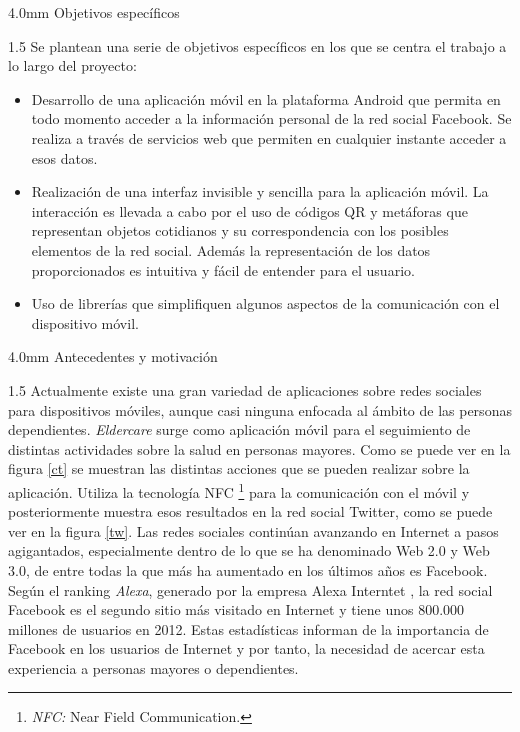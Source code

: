 \documentclass[12pt,a4paper,spanish,oneside]{report}
\makeatletter
\renewcommand{\subsection}{
  \@startsection{subsection}{2}{0mm}{2mm}
  {4.0mm}{\Large\bf}
}
\theoremstyle{plain} \newtheorem{nota}{Nota}
\makeatother
\begin{document}
\subsection{Objetivos específicos}
\begin{spacing}{1.5}
Se plantean una serie de objetivos específicos en los que se centra el trabajo a
lo largo del proyecto:
\begin{itemize}
\item Desarrollo de una aplicación móvil en la plataforma Android que permita en
todo momento acceder a la información personal de la red social Facebook. Se 
realiza a través de servicios web que permiten en cualquier instante acceder a 
esos datos.
\item Realización de una interfaz invisible y sencilla para la aplicación móvil.
La interacción es llevada a cabo por el uso de códigos QR y metáforas
 que representan objetos cotidianos y su correspondencia con los posibles 
elementos de la red social. Además la representación de los datos 
proporcionados es intuitiva y fácil de entender para el usuario.
\item Uso de librerías que simplifiquen algunos aspectos de la comunicación con 
el dispositivo móvil.
\end{itemize}
\end{spacing}
\subsection{Antecedentes y motivación}
\begin{spacing}{1.5}
Actualmente existe una gran variedad de aplicaciones sobre redes sociales para 
dispositivos móviles, aunque casi ninguna enfocada al ámbito de las personas
dependientes. \emph{Eldercare} \cite{CTW} surge como aplicación móvil para el 
seguimiento de distintas actividades sobre la salud en personas mayores. Como 
se puede ver en la figura \ref{ct} se muestran las distintas acciones que se 
pueden realizar sobre la aplicación. 
Utiliza la tecnología NFC \footnote[1]{\emph{NFC:} Near Field Communication.} 
para la comunicación con el móvil y posteriormente muestra esos resultados en 
la red social Twitter, como se puede ver en la figura \ref{tw}.
Las redes sociales continúan avanzando en Internet a pasos agigantados, 
especialmente dentro de lo que se ha denominado Web 2.0 y Web 3.0, de entre 
todas la que más ha aumentado en los últimos años es Facebook. Según el ranking
\emph{Alexa}, generado por la empresa Alexa Interntet \cite{ALX}, la red social
 Facebook es el segundo sitio más visitado en Internet y tiene unos 800.000 
millones de usuarios en 2012. Estas estadísticas informan de la importancia de
Facebook en los usuarios de Internet y por tanto, la necesidad de acercar esta
experiencia a personas mayores o dependientes.
\end{spacing}
\end{document}
